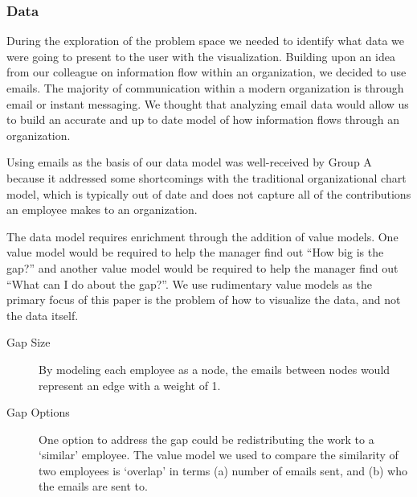 \documentclass[journal]{vgtc}                %
\begin{document}
\subsubsection{Data}
During the exploration of the problem space we needed to identify what data we were going to present to the user with the visualization.  Building upon an idea from our colleague on information flow within an organization, we decided to use emails.  The majority of communication within a modern organization is through email or instant messaging.  We thought that analyzing email data would allow us to build an accurate and up to date model of how information flows through an organization.  

Using emails as the basis of our data model was well-received by Group A because it addressed some shortcomings with the traditional organizational chart model, which is typically out of date and does not capture all of the contributions an employee makes to an organization.

The data model requires enrichment through the addition of value models.  One value model would be required to help the manager find out ``How big is the gap?'' and another value model would be required to help the manager find out ``What can I do about the gap?''.  We use rudimentary value models as the primary focus of this paper is the problem of how to visualize the data, and not the data itself.

\begin{description}
\item [Gap Size] By modeling each employee as a node, the emails between nodes would represent an edge with a weight of 1.
\item [Gap Options] One option to address the gap could be redistributing the work to a \lq similar\rq{} employee. The value model we used to compare the similarity of two employees is \lq overlap\rq{} in terms (a) number of emails sent, and (b) who the emails are sent to.
\end{description}
\end{document}
